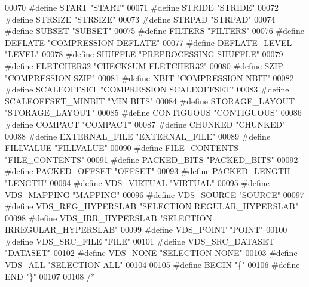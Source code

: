 \begin{DoxyCode}
{00070 \textcolor{preprocessor}{#define START           "START"}
00071 \textcolor{preprocessor}{#define STRIDE          "STRIDE"}
00072 \textcolor{preprocessor}{#define STRSIZE         "STRSIZE"}
00073 \textcolor{preprocessor}{#define STRPAD          "STRPAD"}
00074 \textcolor{preprocessor}{#define SUBSET          "SUBSET"}
00075 \textcolor{preprocessor}{#define FILTERS         "FILTERS"}
00076 \textcolor{preprocessor}{#define DEFLATE         "COMPRESSION DEFLATE"}
00077 \textcolor{preprocessor}{#define DEFLATE\_LEVEL   "LEVEL"}
00078 \textcolor{preprocessor}{#define SHUFFLE         "PREPROCESSING SHUFFLE"}
00079 \textcolor{preprocessor}{#define FLETCHER32      "CHECKSUM FLETCHER32"}
00080 \textcolor{preprocessor}{#define SZIP            "COMPRESSION SZIP"}
00081 \textcolor{preprocessor}{#define NBIT            "COMPRESSION NBIT"}
00082 \textcolor{preprocessor}{#define SCALEOFFSET     "COMPRESSION SCALEOFFSET"}
00083 \textcolor{preprocessor}{#define SCALEOFFSET\_MINBIT            "MIN BITS"}
00084 \textcolor{preprocessor}{#define STORAGE\_LAYOUT  "STORAGE\_LAYOUT"}
00085 \textcolor{preprocessor}{#define CONTIGUOUS      "CONTIGUOUS"}
00086 \textcolor{preprocessor}{#define COMPACT         "COMPACT"}
00087 \textcolor{preprocessor}{#define CHUNKED         "CHUNKED"}
00088 \textcolor{preprocessor}{#define EXTERNAL\_FILE   "EXTERNAL\_FILE"}
00089 \textcolor{preprocessor}{#define FILLVALUE       "FILLVALUE"}
00090 \textcolor{preprocessor}{#define FILE\_CONTENTS   "FILE\_CONTENTS"}
00091 \textcolor{preprocessor}{#define PACKED\_BITS     "PACKED\_BITS"}
00092 \textcolor{preprocessor}{#define PACKED\_OFFSET   "OFFSET"}
00093 \textcolor{preprocessor}{#define PACKED\_LENGTH   "LENGTH"}
00094 \textcolor{preprocessor}{#define VDS\_VIRTUAL     "VIRTUAL"}
00095 \textcolor{preprocessor}{#define VDS\_MAPPING     "MAPPING"}
00096 \textcolor{preprocessor}{#define VDS\_SOURCE      "SOURCE"}
00097 \textcolor{preprocessor}{#define VDS\_REG\_HYPERSLAB   "SELECTION REGULAR\_HYPERSLAB"}
00098 \textcolor{preprocessor}{#define VDS\_IRR\_HYPERSLAB   "SELECTION IRREGULAR\_HYPERSLAB"}
00099 \textcolor{preprocessor}{#define VDS\_POINT       "POINT"}
00100 \textcolor{preprocessor}{#define VDS\_SRC\_FILE    "FILE"}
00101 \textcolor{preprocessor}{#define VDS\_SRC\_DATASET "DATASET"}
00102 \textcolor{preprocessor}{#define VDS\_NONE        "SELECTION NONE"}
00103 \textcolor{preprocessor}{#define VDS\_ALL         "SELECTION ALL"}
00104 
00105 \textcolor{preprocessor}{#define BEGIN           "\{"}
00106 \textcolor{preprocessor}{#define END             "\}"}
00107 
00108 \textcolor{comment}{/*}
}
\end{DoxyCode}
